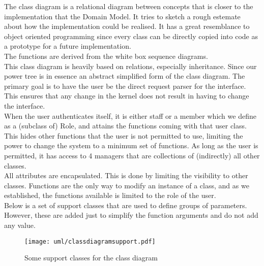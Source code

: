 The class diagram is a relational diagram between concepts that is closer to the implementation that the Domain Model. It tries to sketch a rough estemate about how the implementation could be realised. It has a great resemblance to object oriented programming since every class can be directly copied into code as a prototype for a future implementation.\\
The functions are derived from the white box sequence diagrams.\\
This class diagram is heavily based on relations, especially inheritance. Since our power tree is in essence an abstract simplified form of the class diagram. The primary goal is to have the user be the direct request parser for the interface. This ensures that any change in the kernel does not result in having to change the interface.\\
When the user authenticates itself, it is either staff or a member which we define as a (subclass of) Role, and attains the functions coming with that user class. This hides other functions that the user is not permitted to use, limiting the power to change the system to a minimum set of functions. As long as the user is permitted, it has access to 4 managers that are collections of (indirectly) all other classes.\\
All attributes are encapsulated. This is done by limiting the visibility to other classes. Functions are the only way to modify an instance of a class, and as we established, the functions available is limited to the role of the user.\\


Below is a set of support classes that are used to define groups of parameters. However, these are added just to simplify the function arguments and do not add any value.
\begin{figure}[H]
	\centering
	\texttt{[image: uml/classdiagramsupport.pdf]}
	\caption*{Some support classes for the class diagram}
\end{figure}